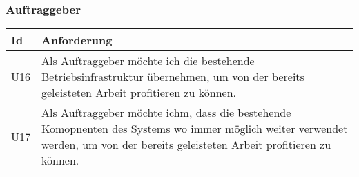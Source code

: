 \subsubsection*{Auftraggeber}

\begin{table}[h]
    \centering
    \begin{tabular}{|l|p{15cm}|}
        \hline
        \textbf{Id} & \textbf{Anforderung}                                                                                                                                                             \\
        \hline
        U16           & Als Auftraggeber möchte ich die bestehende Betriebsinfrastruktur übernehmen, um von der bereits geleisteten Arbeit profitieren zu können.                                        \\
        \hline
        U17           & Als Auftraggeber möchte ichm, dass die bestehende Komopnenten des Systems wo immer möglich weiter verwendet werden, um von der bereits geleisteten Arbeit profitieren zu können. \\
        \hline
    \end{tabular}\label{tab:userstories3}
\end{table}


\clearpage
